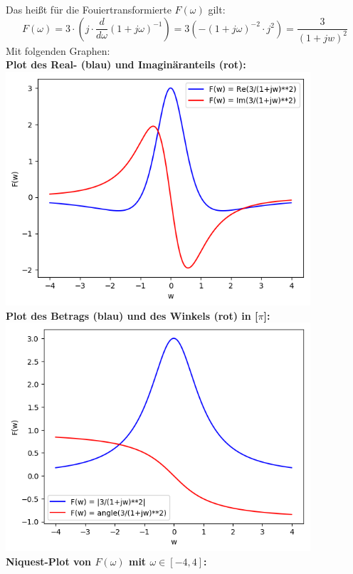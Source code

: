 		Das heißt für die Fouiertransformierte $F(\omega)$ gilt:
		$$F(\omega) = 3\cdot \left(j\cdot \frac{d}{d\omega}\left(1+j\omega\right)^{-1}\right) = 3\left(-\left(1+j\omega\right)^{-2}\cdot j^2\right) = \frac{3}{(1+jw)^2}$$
		\newpage
		Mit folgenden Graphen:\\
		\textbf{Plot des Real- (blau) und Imaginäranteils (rot):}\\
		\includegraphics[width = 0.85\textwidth]{A29_plot-real-imag.png}\\
		\textbf{Plot des Betrags (blau) und des Winkels (rot) in [$\pi$]:}\\
		\includegraphics[width= 0.85\textwidth]{A29_plot-abs-angle.png}\\
		\textbf{Niquest-Plot von $F(\omega)$ mit $\omega\in[-4,4]$:}\\
